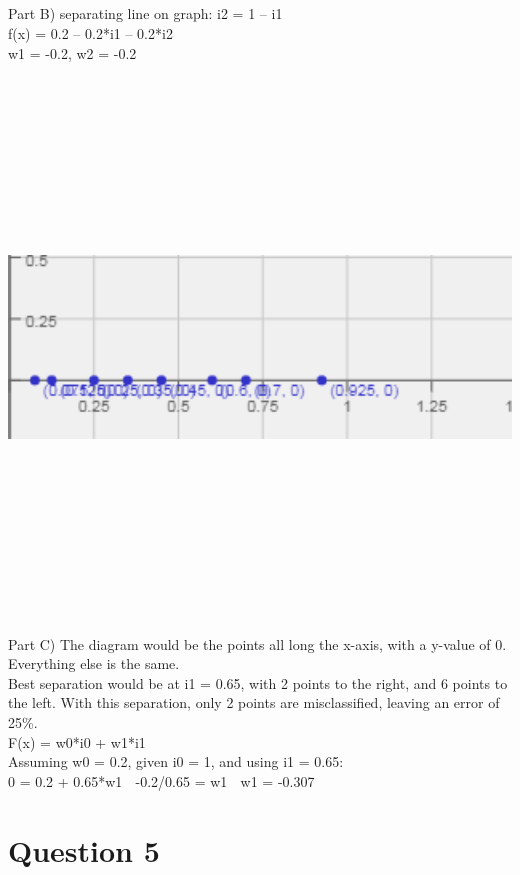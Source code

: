 \documentclass{article}
\begin{document}
\\
\\
\\
\\
{\LARGE Part B)}
separating line on graph: i2 = 1 – i1
\\
f(x) = 0.2 – 0.2*i1 – 0.2*i2
\\
w1 = -0.2, w2 = -0.2
\\
\includegraphics[width=15cm,height=15cm,keepaspectratio]{"graph1"}
\\
{\LARGE Part C)}
The diagram would be the points all long the x-axis, with a y-value of 0. Everything else is the same.
\\
Best separation would be at i1 = 0.65, with 2 points to the right, and 6 points to the left. With this separation, only 2 points are misclassified, leaving an error of 25\%.
\\
F(x) = w0*i0 + w1*i1
\\
Assuming w0 = 0.2, given i0 = 1, and using i1 = 0.65:
\\
0 = 0.2 + 0.65*w1  -0.2/0.65 = w1  w1 = -0.307
\\
\section{Question 5}
\end{document}
